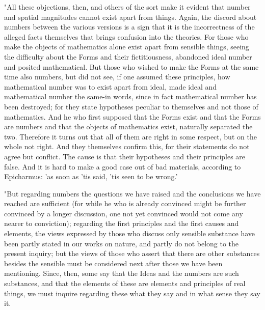 "All these objections, then, and others of the sort make it evident
that number and spatial magnitudes cannot exist apart from things.
Again, the discord about numbers between the various versions is a
sign that it is the incorrectness of the alleged facts themselves
that brings confusion into the theories. For those who make the objects
of mathematics alone exist apart from sensible things, seeing the
difficulty about the Forms and their fictitiousness, abandoned ideal
number and posited mathematical. But those who wished to make the
Forms at the same time also numbers, but did not see, if one assumed
these principles, how mathematical number was to exist apart from
ideal, made ideal and mathematical number the same-in words, since
in fact mathematical number has been destroyed; for they state hypotheses
peculiar to themselves and not those of mathematics. And he who first
supposed that the Forms exist and that the Forms are numbers and that
the objects of mathematics exist, naturally separated the two. Therefore
it turns out that all of them are right in some respect, but on the
whole not right. And they themselves confirm this, for their statements
do not agree but conflict. The cause is that their hypotheses and
their principles are false. And it is hard to make a good case out
of bad materials, according to Epicharmus: 'as soon as 'tis said,
'tis seen to be wrong.' 

"But regarding numbers the questions we have raised and the conclusions
we have reached are sufficient (for while he who is already convinced
might be further convinced by a longer discussion, one not yet convinced
would not come any nearer to conviction); regarding the first principles
and the first causes and elements, the views expressed by those who
discuss only sensible substance have been partly stated in our works
on nature, and partly do not belong to the present inquiry; but the
views of those who assert that there are other substances besides
the sensible must be considered next after those we have been mentioning.
Since, then, some say that the Ideas and the numbers are such substances,
and that the elements of these are elements and principles of real
things, we must inquire regarding these what they say and in what
sense they say it. 

